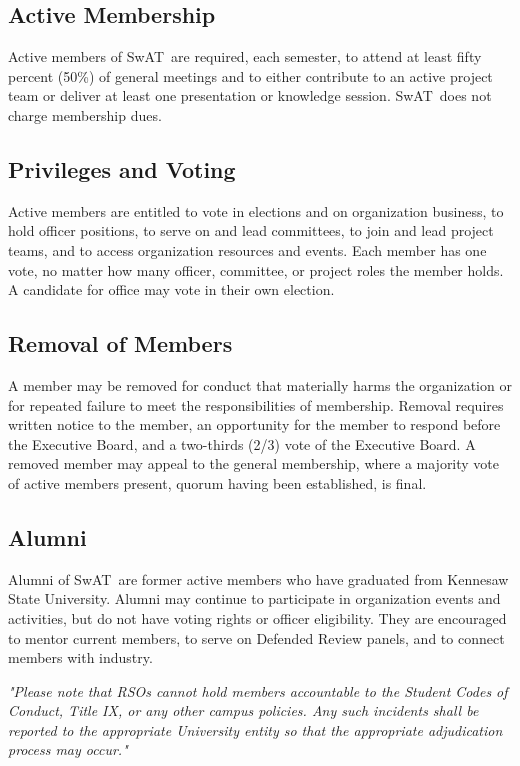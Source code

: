 \documentclass[12pt,letterpaper]{article} %
\newcommand{\orgshort}{SwAT}
\begin{document}
\subsection{Active Membership}\label{sec:active-membership}
Active members of \orgshort\ are required, each semester, to attend at least fifty percent
(50\%) of general meetings and to either contribute to an active project team or deliver
at least one presentation or knowledge session. \orgshort\ does not charge membership dues.
\subsection{Privileges and Voting}\label{sec:privileges}
Active members are entitled to vote in elections and on organization business, to hold officer
positions, to serve on and lead committees, to join and lead project teams, and to access
organization resources and events.
Each member has one vote, no matter how many officer, committee, or project roles the member
holds. A candidate for office may vote in their own election.
\subsection{Removal of Members}\label{sec:member-removal}
A member may be removed for conduct that materially harms the organization or for repeated
failure to meet the responsibilities of membership. Removal requires written notice to the
member, an opportunity for the member to respond before the Executive Board, and a two-thirds
(2/3) vote of the Executive Board. A removed member may appeal to the general membership,
where a majority vote of active members present, quorum having been established, is final.
\subsection{Alumni}\label{sec:alumni}
Alumni of \orgshort\ are former active members who have graduated from Kennesaw State
University. Alumni may continue to participate in organization events and activities, but do
not have voting rights or officer eligibility. They are encouraged to mentor current members,
to serve on Defended Review panels, and to connect members with industry.

\bigskip
\noindent\textit{"Please note that RSOs cannot hold members accountable to the Student Codes
of Conduct, Title IX, or any other campus policies. Any such incidents shall be reported to
the appropriate University entity so that the appropriate adjudication process may occur."}
\end{document}
